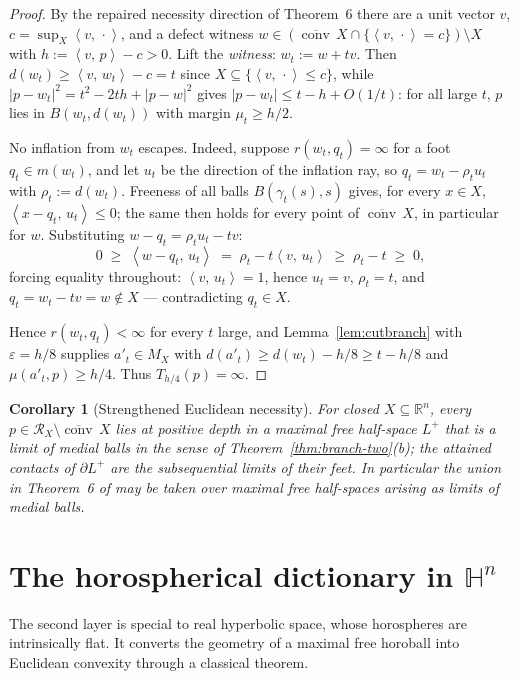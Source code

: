 \documentclass[11pt]{article}
\newtheorem{corollary}[theorem]{Corollary}
\theoremstyle{remark}
\newcommand{\R}{\mathbb{R}}
\newcommand{\X}{X}
\newcommand{\Mx}{M_{\X}}
\newcommand{\Rx}{\mathcal{R}_{\X}}
\newcommand{\conv}{\operatorname{conv}}
\newcommand{\cconv}[1]{\overline{\conv}\,#1}
\newcommand{\B}{B}
\newcommand{\sca}[2]{\left\langle #1,\, #2\right\rangle}
\begin{document}
\begin{proof}
By the repaired necessity direction of Theorem~6 \cite[\S4.6]{Notes}
there are a unit vector $v$, $c=\sup_{\X}\sca{v}{\cdot}$, and a
defect witness
$w\in(\cconv\X\cap\{\sca{v}{\cdot}=c\})\setminus\X$ with
$h:=\sca{v}{p}-c>0$. Lift the \emph{witness}: $w_{t}:=w+tv$. Then
$d(w_{t})\ge\sca{v}{w_{t}}-c=t$ since
$\X\subseteq\{\sca{v}{\cdot}\le c\}$, while
$|p-w_{t}|^{2}=t^{2}-2th+|p-w|^{2}$ gives
$|p-w_{t}|\le t-h+O(1/t)$: for all large $t$, $p$ lies in
$\B(w_{t},d(w_{t}))$ with margin $\mu_{t}\ge h/2$.

No inflation from $w_{t}$ escapes. Indeed, suppose
$r(w_{t},q_{t})=\infty$ for a foot $q_{t}\in m(w_{t})$, and let
$u_{t}$ be the direction of the inflation ray, so
$q_{t}=w_{t}-\rho_{t}u_{t}$ with $\rho_{t}:=d(w_{t})$. Freeness of
all balls $\B(\gamma_{t}(s),s)$ gives, for every $x\in\X$,
$\sca{x-q_{t}}{u_{t}}\le0$; the same then holds for every point of
$\cconv\X$, in particular for $w$. Substituting
$w-q_{t}=\rho_{t}u_{t}-tv$:
\[
0\;\ge\;\sca{w-q_{t}}{u_{t}}\;=\;\rho_{t}-t\sca{v}{u_{t}}
\;\ge\;\rho_{t}-t\;\ge\;0 ,
\]
forcing equality throughout: $\sca{v}{u_{t}}=1$, hence $u_{t}=v$,
$\rho_{t}=t$, and $q_{t}=w_{t}-tv=w\notin\X$ --- contradicting
$q_{t}\in\X$.

Hence $r(w_{t},q_{t})<\infty$ for every $t$ large, and
Lemma~\ref{lem:cutbranch} with $\varepsilon=h/8$ supplies
$a'_{t}\in\Mx$ with $d(a'_{t})\ge d(w_{t})-h/8\ge t-h/8$ and
$\mu(a'_{t},p)\ge h/4$. Thus $T_{h/4}(p)=\infty$.
\end{proof}

\begin{corollary}[Strengthened Euclidean necessity]
\label{cor:euclidean}
For closed $\X\subseteq\R^{n}$, every $p\in\Rx\setminus\cconv\X$ lies
at positive depth in a maximal free half-space $L^{+}$ that is a limit
of medial balls in the sense of
Theorem~\ref{thm:branch-two}(b); the attained contacts of $\partial
L^{+}$ are the subsequential limits of their feet. In particular the
union in Theorem~6 of \cite{Bia} may be taken over maximal free
half-spaces arising as limits of medial balls.
\end{corollary}

\section{The horospherical dictionary in $\mathbb{H}^{n}$}\label{sec:dictionary}

The second layer is special to real hyperbolic space,
whose horospheres are intrinsically flat. It converts the geometry of a
maximal free horoball into Euclidean convexity through a classical
theorem.
\end{document}

